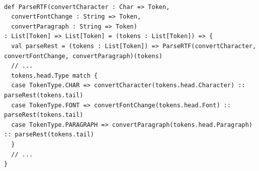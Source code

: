 \begin{lstlisting}[caption={Builder Funcional},label=fpbuilder]
    
def ParseRTF(convertCharacter : Char => Token,
  convertFontChange : String => Token,
  convertParagraph : String => Token)
: List[Token] => List[Token] = (tokens : List[Token]) => {
  val parseRest = (tokens : List[Token]) => ParseRTF(convertCharacter, convertFontChange, convertParagraph)(tokens)
  // ...
  tokens.head.Type match {
  case TokenType.CHAR => convertCharacter(tokens.head.Character) :: parseRest(tokens.tail)
  case TokenType.FONT => convertFontChange(tokens.head.Font) :: parseRest(tokens.tail)
  case TokenType.PARAGRAPH => convertParagraph(tokens.head.Paragraph) :: parseRest(tokens.tail)
  }
  // ...
}
    
\end{lstlisting}